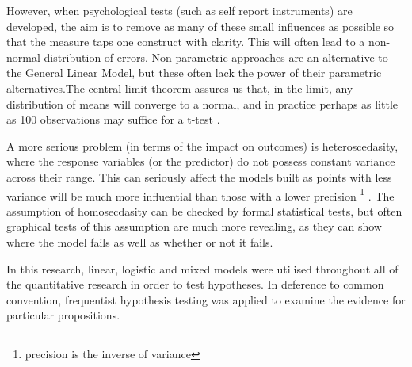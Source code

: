 However, when psychological tests (such as self report instruments) are developed, the aim is to remove as many of these small influences as possible so that the measure taps one construct with clarity. This will often lead to a non-normal distribution of errors. Non parametric approaches are an alternative to the General Linear Model, but these often lack the power of their parametric alternatives.The central limit theorem assures us that, in the limit, any distribution of means will converge to a normal, and in practice perhaps as little as 100 observations may suffice for a t-test \cite{venables2002modern}. 

A more serious problem (in terms of the impact on outcomes) is heteroscedasity, where the response variables (or the predictor) do not possess constant variance across their range\cite{gelman2007data}. This can seriously affect the models built as points with less variance will be much more influential than those with a lower precision \footnote{precision is the inverse of variance\cite{gelman2007data}} . The assumption of homosecdasity can be checked by formal statistical tests, but often graphical tests of this assumption are much more revealing, as they can show where the model fails as well as whether or not it fails.

In this research, linear, logistic and mixed models were utilised throughout all of the quantitative research in order to test hypotheses. In deference to common convention, frequentist hypothesis testing was applied to examine the evidence for particular propositions. 


